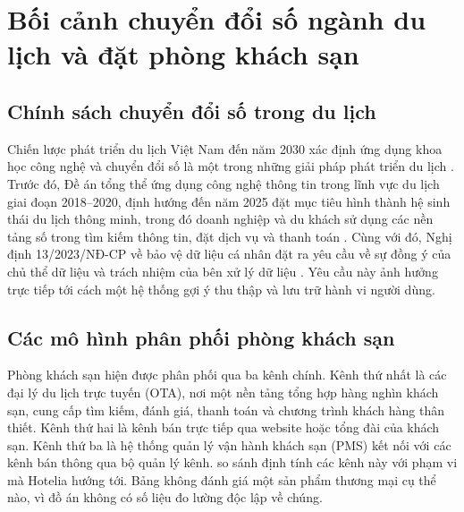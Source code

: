 \section{Bối cảnh chuyển đổi số ngành du lịch và đặt phòng khách sạn}\label{sec:context}

\subsection{Chính sách chuyển đổi số trong du lịch}

Chiến lược phát triển du lịch Việt Nam đến năm 2030 xác định ứng dụng khoa học công nghệ và chuyển đổi số là một trong những giải pháp phát triển du lịch \cite{qd147}. Trước đó, Đề án tổng thể ứng dụng công nghệ thông tin trong lĩnh vực du lịch giai đoạn 2018--2020, định hướng đến năm 2025 đặt mục tiêu hình thành hệ sinh thái du lịch thông minh, trong đó doanh nghiệp và du khách sử dụng các nền tảng số trong tìm kiếm thông tin, đặt dịch vụ và thanh toán \cite{qd1671}. Cùng với đó, Nghị định 13/2023/NĐ-CP về bảo vệ dữ liệu cá nhân đặt ra yêu cầu về sự đồng ý của chủ thể dữ liệu và trách nhiệm của bên xử lý dữ liệu \cite{nd13}. Yêu cầu này ảnh hưởng trực tiếp tới cách một hệ thống gợi ý thu thập và lưu trữ hành vi người dùng.

\subsection{Các mô hình phân phối phòng khách sạn}

Phòng khách sạn hiện được phân phối qua ba kênh chính. Kênh thứ nhất là các đại lý du lịch trực tuyến (OTA), nơi một nền tảng tổng hợp hàng nghìn khách sạn, cung cấp tìm kiếm, đánh giá, thanh toán và chương trình khách hàng thân thiết. Kênh thứ hai là kênh bán trực tiếp qua website hoặc tổng đài của khách sạn. Kênh thứ ba là hệ thống quản lý vận hành khách sạn (PMS) kết nối với các kênh bán thông qua bộ quản lý kênh.  so sánh định tính các kênh này với phạm vi mà Hotelia hướng tới. Bảng không đánh giá một sản phẩm thương mại cụ thể nào, vì đồ án không có số liệu đo lường độc lập về chúng.

